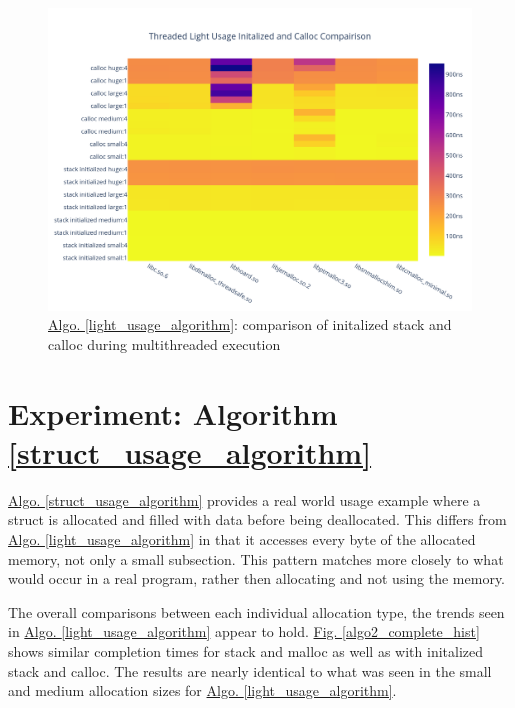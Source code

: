 \documentclass[letterpaper, 10 pt, conference]{ieeeconf}  %
\begin{document}
\begin{figure}[tbh!]
  \centering
  \includegraphics[width=\columnwidth]{graphs/light_init_calloc_threaded_hist.png}
  \caption{ \hyperref[light_usage_algorithm]{Algo. \ref{light_usage_algorithm}}: comparison of initalized stack and calloc during multithreaded execution }
  \label{algo1_init_calloc_threaded_hist}
\end{figure}

\section{Experiment: Algorithm \ref{struct_usage_algorithm}}

\hyperref[struct_usage_algorithm]{Algo. \ref{struct_usage_algorithm}} provides a real world usage example where a struct is allocated and filled with data before being deallocated.
This differs from \hyperref[light_usage_algorithm]{Algo. \ref*{light_usage_algorithm}} in that it accesses every byte of the allocated memory, not only a small subsection.
This pattern matches more closely to what would occur in a real program, rather then allocating and not using the memory.

The overall comparisons between each individual allocation type, the trends seen in \hyperref[light_usage_algorithm]{Algo. \ref*{light_usage_algorithm}} appear to hold.
\hyperref[algo2_complete_hist]{Fig. \ref{algo2_complete_hist}} shows similar completion times for stack and malloc as well as with initalized stack and calloc.
The results are nearly identical to what was seen in the small and medium allocation sizes for \hyperref[light_usage_algorithm]{Algo. \ref*{light_usage_algorithm}}.
\end{document}
